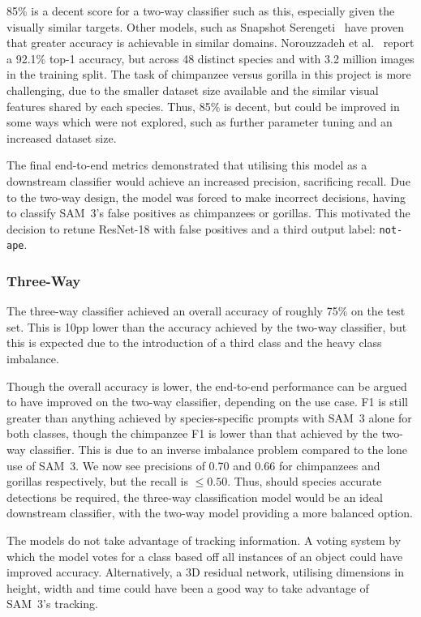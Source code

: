 \documentclass[author={Jacob Stephenson},
    degree={BSc},
    title={Robust Great Ape Species Detection in Wild Camera Trap Imagery with Promptable Concept Segmentation},
    unit={COMS30045},
    subtitle={}]{dissertation}
\begin{document}
85\% is a decent score for a two-way classifier such as this, especially given the visually similar targets. Other models, such as Snapshot Serengeti~\cite{norouzzadeh2017automaticallyidentifyingcountingdescribing} have proven that greater accuracy is achievable in similar domains. Norouzzadeh et al.~\cite{norouzzadeh2017automaticallyidentifyingcountingdescribing} report a 92.1\% top-1 accuracy, but across 48 distinct species and with 3.2 million images in the training split. The task of chimpanzee versus gorilla in this project is more challenging, due to the smaller dataset size available and the similar visual features shared by each species. Thus, 85\% is decent, but could be improved in some ways which were not explored, such as further parameter tuning and an increased dataset size.

The final end-to-end metrics demonstrated that utilising this model as a downstream classifier would achieve an increased precision, sacrificing recall. Due to the two-way design, the model was forced to make incorrect decisions, having to classify SAM~3's false positives as chimpanzees or gorillas. This motivated the decision to retune ResNet-18 with false positives and a third output label: \texttt{not-ape}.

\subsubsection{Three-Way}

The three-way classifier achieved an overall accuracy of roughly 75\% on the test set. This is 10pp lower than the accuracy achieved by the two-way classifier, but this is expected due to the introduction of a third class and the heavy class imbalance.

Though the overall accuracy is lower, the end-to-end performance can be argued to have improved on the two-way classifier, depending on the use case. F1 is still greater than anything achieved by species-specific prompts with SAM~3 alone for both classes, though the chimpanzee F1 is lower than that achieved by the two-way classifier. This is due to an inverse imbalance problem compared to the lone use of SAM~3. We now see precisions of 0.70 and 0.66 for chimpanzees and gorillas respectively, but the recall is $\leq0.50$. Thus, should species accurate detections be required, the three-way classification model would be an ideal downstream classifier, with the two-way model providing a more balanced option.

The models do not take advantage of tracking information. A voting system by which the model votes for a class based off all instances of an object could have improved accuracy. Alternatively, a 3D residual network, utilising dimensions in height, width and time could have been a good way to take advantage of SAM~3's tracking.
\end{document}
